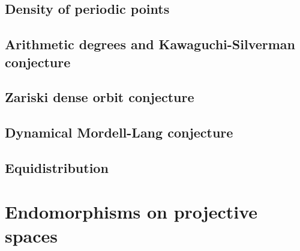 \documentclass[sectionlevel=book,status=draft]{noteformyself}
\begin{document}
        \section[
          status=draft,
          tag=00000,
          label=\labelNFM{sec:periodic-points-and-orbits:density-of-periodic-points-for-cohomologically-hyperbolic-maps}
        ]{Density of periodic points}
        
        \section[
          status=draft,
          tag=00000,
          label=\labelNFM{sec:periodic-points-and-orbits:arithmetic-degrees-and-kawaguchi-silverman-conjecture}
        ]{Arithmetic degrees and Kawaguchi-Silverman conjecture}
        
        \section[
          status=draft,
          tag=00000,
          label=\labelNFM{sec:periodic-points-and-orbits:zariski-dense-orbit-conjecture}
        ]{Zariski dense orbit conjecture}
        
        \section[
          status=draft,
          tag=00000,
          label=\labelNFM{sec:periodic-points-and-orbits:dynamical-mordell-lang-conjecture}
        ]{Dynamical Mordell-Lang conjecture}
        
        \section[
          status=draft,
          tag=00000,
          label=\labelNFM{sec:periodic-points-and-orbits:equidistribution}
        ]{Equidistribution}
        

    \chapter[
      status=draft,
      tag=DPN,
      label=\labelNFM{chap:endomorphisms-on-projective-spaces}
    ]{Endomorphisms on projective spaces}
\end{document}

